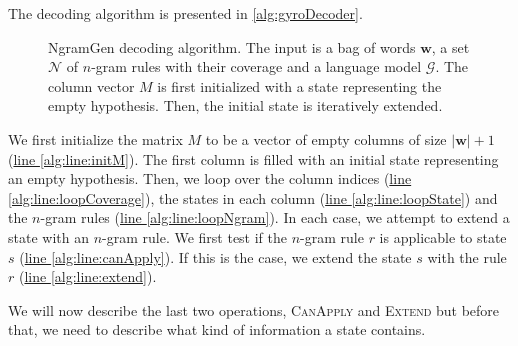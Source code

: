 The decoding algorithm is presented in \autoref{alg:gyroDecoder}.
%
\begin{figure}
  \begin{algorithmic}[1]
       \hypertarget{alg:line:initM}{} \label{alg:line:initM}
       \hypertarget{alg:line:loopCoverage}{} \label{alg:line:loopCoverage}
         \hypertarget{alg:line:loopState}{} \label{alg:line:loopState}
           \hypertarget{alg:line:loopNgram}{} \label{alg:line:loopNgram}
             \hypertarget{alg:line:canApply}{} \label{alg:line:canApply}
               \hypertarget{alg:line:extend}{} \label{alg:line:extend}
            \EndIf
          \EndFor
        \EndFor
      \EndFor
    \EndFunction
  \end{algorithmic}
  \caption{NgramGen decoding algorithm. The input is a bag of words $\bm{w}$,
  a set $\mathcal{N}$ of $n$-gram rules with their coverage and a language model
  $\mathcal{G}$. The column vector $M$ is first initialized with a state representing
  the empty hypothesis. Then, the initial state is iteratively extended.}
  \label{alg:gyroDecoder}
\end{figure}
%
We first initialize the matrix $M$ to be a vector of empty
columns of size $|\bm{w}| + 1$ (\hyperlink{alg:line:initM}{line \ref{alg:line:initM}}).
The first column is filled with an initial state representing an empty hypothesis.
Then, we loop over the column indices
(\hyperlink{alg:line:initM}{line \ref{alg:line:loopCoverage}}), the states in each
column (\hyperlink{alg:line:loopState}{line \ref{alg:line:loopState}}) and the
$n$-gram rules (\hyperlink{alg:line:loopNgram}{line \ref{alg:line:loopNgram}}).
In each case, we attempt to extend a state with an $n$-gram rule. We first test
if the $n$-gram rule $r$ is applicable to state $s$
(\hyperlink{alg:line:canApply}{line \ref{alg:line:canApply}}). If this
is the case, we extend the state $s$ with the rule $r$
(\hyperlink{alg:line:extend}{line \ref{alg:line:extend}}).

We will now describe the last two operations, \textsc{CanApply}
and \textsc{Extend} but before that, we need to describe what kind
of information a state contains.

